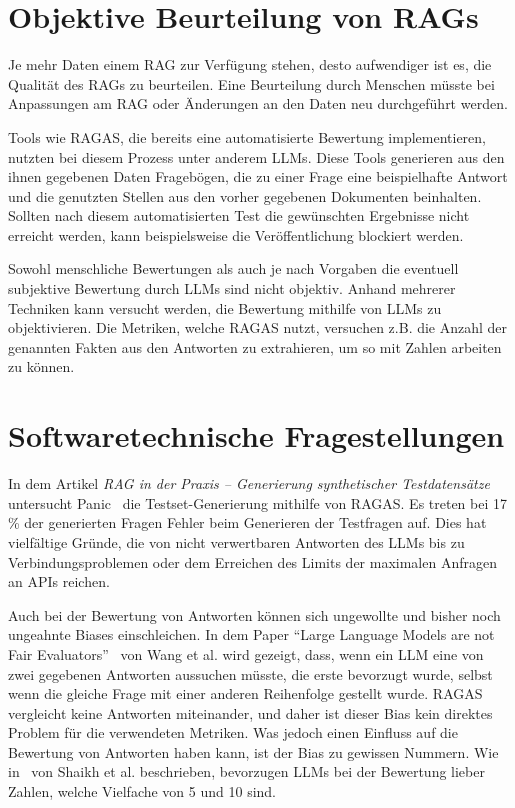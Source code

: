 \section{Objektive Beurteilung von RAGs}
Je mehr Daten einem RAG zur Verfügung stehen, desto aufwendiger ist es, die Qualität des RAGs zu beurteilen.
Eine Beurteilung durch Menschen müsste bei Anpassungen am RAG oder Änderungen an den Daten neu durchgeführt werden.

Tools wie RAGAS, die bereits eine automatisierte Bewertung implementieren, nutzten bei diesem Prozess unter anderem LLMs.
Diese Tools generieren aus den ihnen gegebenen Daten Fragebögen, die zu einer Frage eine beispielhafte Antwort und die genutzten Stellen aus den vorher gegebenen Dokumenten beinhalten.
Sollten nach diesem automatisierten Test die gewünschten Ergebnisse nicht erreicht werden, kann beispielsweise die Veröffentlichung blockiert werden.

Sowohl menschliche Bewertungen als auch je nach Vorgaben die eventuell subjektive Bewertung durch LLMs sind nicht objektiv.
Anhand mehrerer Techniken kann versucht werden, die Bewertung mithilfe von LLMs zu objektivieren. Die Metriken, welche RAGAS nutzt, versuchen z.B. die Anzahl der genannten Fakten aus den Antworten zu extrahieren, um so mit Zahlen arbeiten zu können.

\section{Softwaretechnische Fragestellungen}

In dem Artikel \textit{RAG in der Praxis – Generierung synthetischer Testdatensätze} untersucht Panic~\cite{pixion2024rag} die Testset-Generierung mithilfe von RAGAS. Es treten bei 17 \% der generierten Fragen Fehler beim Generieren der Testfragen auf.
Dies hat vielfältige Gründe, die von nicht verwertbaren Antworten des LLMs bis zu Verbindungsproblemen oder dem Erreichen des Limits der maximalen Anfragen an APIs reichen.

Auch bei der Bewertung von Antworten können sich ungewollte und bisher noch ungeahnte Biases einschleichen. In dem Paper \enquote{Large Language Models are not Fair Evaluators}~\cite{wang-etal-2024-large-language-models-fair} von Wang et al. wird gezeigt, dass, wenn ein LLM eine von zwei gegebenen Antworten aussuchen müsste, die erste bevorzugt wurde, selbst wenn die gleiche Frage mit einer anderen Reihenfolge gestellt wurde.
RAGAS vergleicht keine Antworten miteinander, und daher ist dieser Bias kein direktes Problem für die verwendeten Metriken. Was jedoch einen Einfluss auf die Bewertung von Antworten haben kann, ist der Bias zu gewissen Nummern.
Wie in~\cite{2024arXiv241203605S} von Shaikh et al. beschrieben, bevorzugen LLMs bei der Bewertung lieber Zahlen, welche Vielfache von 5 und 10 sind.

